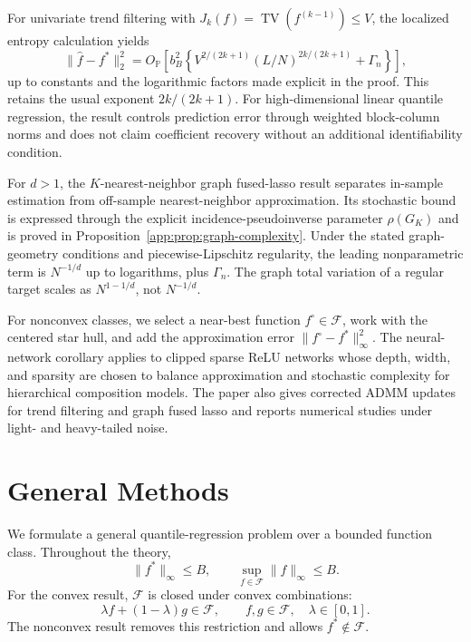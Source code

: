 \documentclass[twoside,11pt]{article}
\newenvironment{revision}{\color{revisionred}}{}
\begin{document}
\begin{revision}
For univariate trend filtering with $J_k(f)=\operatorname{TV}(f^{(k-1)})\le V$, the localized entropy calculation yields
\[
 \|\widehat f-f^*\|_2^2
 =O_{\mathbb P}\left[b_B^2\left\{V^{2/(2k+1)}(L/N)^{2k/(2k+1)}+\Gamma_n\right\}\right],
\]
up to constants and the logarithmic factors made explicit in the proof. This retains the usual exponent $2k/(2k+1)$. For high-dimensional linear quantile regression, the result controls prediction error through weighted block-column norms and does not claim coefficient recovery without an additional identifiability condition.

For $d>1$, the $K$-nearest-neighbor graph fused-lasso result separates in-sample estimation from off-sample nearest-neighbor approximation. Its stochastic bound is expressed through the explicit incidence-pseudoinverse parameter $\rho(G_K)$ and is proved in Proposition~\ref{app:prop:graph-complexity}. Under the stated graph-geometry conditions and piecewise-Lipschitz regularity, the leading nonparametric term is $N^{-1/d}$ up to logarithms, plus $\Gamma_n$. The graph total variation of a regular target scales as $N^{1-1/d}$, not $N^{-1/d}$.

For nonconvex classes, we select a near-best function $f^\circ\in\mathcal F$, work with the centered star hull, and add the approximation error $\|f^\circ-f^*\|_\infty^2$. The neural-network corollary applies to clipped sparse ReLU networks whose depth, width, and sparsity are chosen to balance approximation and stochastic complexity for hierarchical composition models. The paper also gives corrected ADMM updates for trend filtering and graph fused lasso and reports numerical studies under light- and heavy-tailed noise.
\end{revision}
\section{General Methods}

\begin{revision}
We formulate a general quantile-regression problem over a bounded function class. Throughout the theory,
\begin{equation}
 \|f^*\|_\infty\le B,
 \qquad \sup_{f\in\mathcal F}\|f\|_\infty\le B.             \label{F_2}
\end{equation}
For the convex result, $\mathcal F$ is closed under convex combinations:
\begin{equation}
 \lambda f+(1-\lambda)g\in\mathcal F,
 \qquad f,g\in\mathcal F,\quad \lambda\in[0,1].             \label{F_1}
\end{equation}
The nonconvex result removes this restriction and allows $f^*\notin\mathcal F$.
\end{revision}
\end{document}
